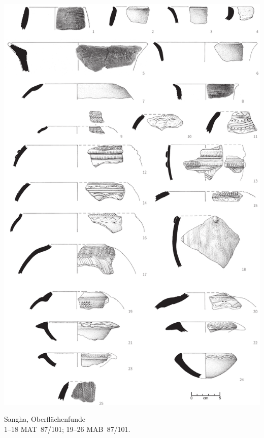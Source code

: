 \begin{pl}[H]
	\includegraphics{plt/Taf60.pdf}
	\vspace{.75em}\caption{\mbox{Sangha}, Oberflächenfunde \\ 1--18 MAT~87/101; 19--26 MAB~87/101.}
	\label{pl:60}
\end{pl}

